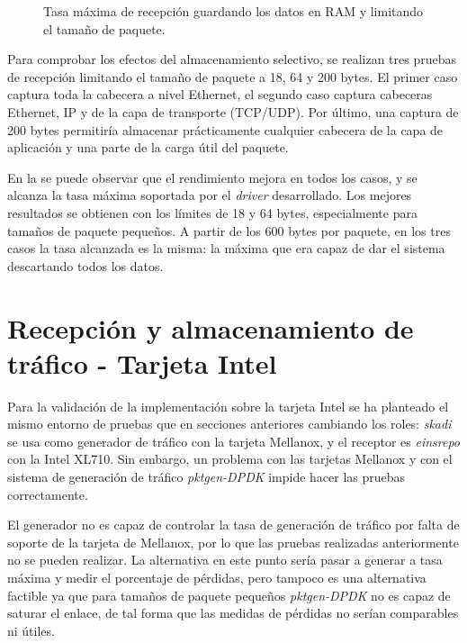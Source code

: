 \documentclass[twoside, 12pt]{epstfg}
\begin{document}
\begin{figure}[hbtp]
\caption[Tasa máxima experimental limitando el tamaño de paquete]{Tasa máxima de recepción guardando los datos en RAM y limitando el tamaño de paquete.}
\label{fig:Validacion:CaplenEffects}
\end{figure}

Para comprobar los efectos del almacenamiento selectivo, se realizan tres pruebas de recepción limitando el tamaño de paquete a 18, 64 y 200 bytes. El primer caso captura toda la cabecera a nivel Ethernet, el segundo caso captura cabeceras Ethernet, IP y de la capa de transporte (TCP/UDP). Por último, una captura de 200 bytes permitiría almacenar prácticamente cualquier cabecera de la capa de aplicación y una parte de la carga útil del paquete.

En la  se puede observar que el rendimiento mejora en todos los casos, y se alcanza la tasa máxima soportada por el \textit{driver} desarrollado. Los mejores resultados se obtienen con los límites de 18 y 64 bytes, especialmente para tamaños de paquete pequeños. A partir de los 600 bytes por paquete, en los tres casos la tasa alcanzada es la misma: la máxima que era capaz de dar el sistema descartando todos los datos.

\section{Recepción y almacenamiento de tráfico - Tarjeta Intel}

Para la validación de la implementación sobre la tarjeta Intel se ha planteado el mismo entorno de pruebas que en secciones anteriores cambiando los roles: \textit{skadi} se usa como generador de tráfico con la tarjeta Mellanox, y el receptor es \textit{einsrepo} con la Intel XL710. Sin embargo, un problema con las tarjetas Mellanox y con el sistema de generación de tráfico \textit{pktgen-DPDK} impide hacer las pruebas correctamente.

El generador no es capaz de controlar la tasa de generación de tráfico por falta de soporte de la tarjeta de Mellanox, por lo que las pruebas realizadas anteriormente no se pueden realizar. La alternativa en este punto sería pasar a generar a tasa máxima y medir el porcentaje de pérdidas, pero tampoco es una alternativa factible ya que para tamaños de paquete pequeños \textit{pktgen-DPDK} no es capaz de saturar el enlace, de tal forma que las medidas de pérdidas no serían comparables ni útiles.
\end{document}
